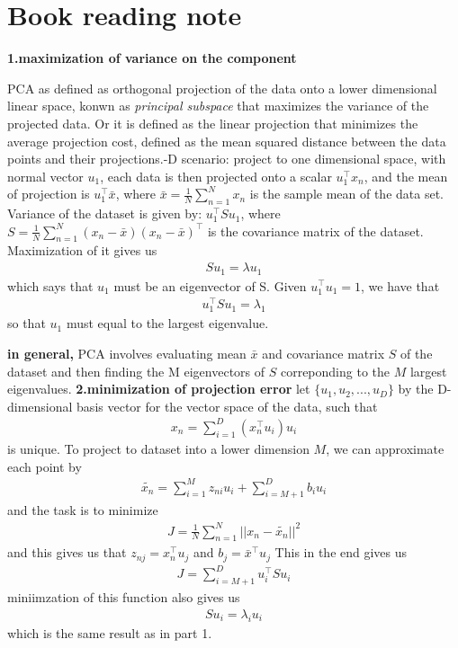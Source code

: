 \documentclass[11pt]{article}
\theoremstyle{plain}
\theoremstyle{definition}
\begin{document}
\section{Book reading note}
\textbf{1.maximization of variance on the component}\newline 

PCA as defined as orthogonal projection of the data onto a lower dimensional linear space, konwn as \textit{principal subspace} that maximizes the variance of the projected data. \newline 
Or it is defined as the linear projection that minimizes the average projection cost, defined as the mean squared distance between the data points and their projections.-D scenario: project to one dimensional space, with normal vector $u_1$, each data is then projected onto a scalar $u_1^\top x_n$, and the mean of projection is $u_1^\top \bar{x}$, where $\bar{x} = \frac{1}{N}\sum\limits_{n=1}^{N} x_n$ is the sample mean of the data set. Variance of the dataset is given by: $u^\top_1 S u_1$, where $S = \frac{1}{N} \sum\limits_{n=1}^{N} (x_n - \bar{x})(x_n -\bar{x})^\top$ is the covariance matrix of the dataset. Maximization of it gives us \begin{align*}
Su_1 = \lambda u_1 
\end{align*}
which says that $u_1$ must be an eigenvector of S. Given $u_1^\top u_1 = 1$, we have that \begin{align*}
u^\top_1 S u_1 = \lambda_1 
\end{align*}
so that $u_1$ must equal to the largest eigenvalue. 

\textbf{in general,} PCA involves evaluating mean $\bar{x}$ and covariance matrix $S$ of the dataset and then finding the M eigenvectors of $S$ correponding to the $M$ largest eigenvalues. \newline 
\vspace{5mm}
\textbf{2.minimization of projection error} \newline 
let $\{ u_1, u_2, ..., u_D\}$ by the D-dimensional basis vector for the vector space of the data, such that  \begin{align*}
x_n = \sum\limits_{i=1}^{D} (x_n^\top u_i) u_i
\end{align*} is unique. 
To project to dataset into a lower dimension $M$, we can approximate each point by \begin{align*}
\tilde{x_n} = \sum\limits_{i=1}^{M} z_{ni}u_i + \sum\limits_{i=M+1}^{D} b_iu_i
\end{align*}
and the task is to minimize \begin{align*}
J = \frac{1}{N} \sum\limits_{n=1}^{N} || x_n - \tilde{x_n}||^2
\end{align*}
and this gives us that $z_{nj} = x^\top_n u_j$ and $b_j = \bar{x}^\top u_j$
This in the end gives us \begin{align*}
J = \sum\limits_{i=M+1}^{D} u_i^\top Su_i
\end{align*}
miniimzation of this function also gives us \begin{align*}
Su_i = \lambda_i u_i 
\end{align*}
which is the same result as in part 1.
\end{document}
